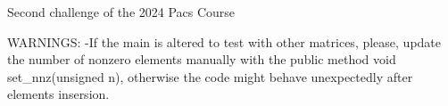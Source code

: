 Second challenge of the 2024 Pacs Course

WARNINGS\+: -\/If the main is altered to test with other matrices, please, update the number of nonzero elements manually with the public method void set\+\_\+nnz(unsigned n), otherwise the code might behave unexpectedly after elements insersion. 